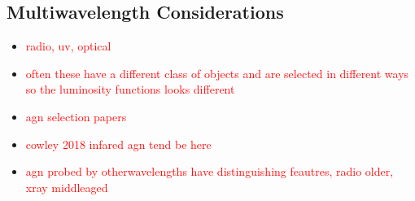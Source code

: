 \subsection{Multiwavelength Considerations}

\begin{itemize}
    \item \textcolor{red}{radio, uv, optical}
    \item \textcolor{red}{often these have a different class of objects and are selected in different ways so the luminosity functions looks different}
    \item \textcolor{red}{agn selection papers}
    \item \textcolor{red}{cowley 2018 infared agn tend be here}
    \item \textcolor{red}{agn probed by otherwavelengths have distinguishing feautres, radio older, xray middleaged}
\end{itemize}